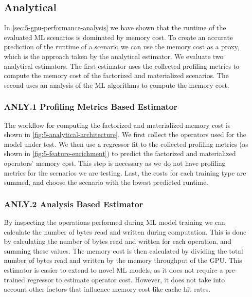 \subsection{Analytical}

In \autoref{sec:5-gpu-performance-analysis} we have shown that the runtime of the evaluated ML scenarios is dominated by memory cost. To create an accurate prediction of the runtime of a scenario we can use the memory cost as a proxy, which is the approach taken by the analytical estimator. We evaluate two analytical estimators. The first estimator uses the collected profiling metrics to compute the memory cost of the factorized and materialized scenarios. The second uses an analysis of the ML algorithms to compute the memory cost.

\subsubsection{ANLY.1 Profiling Metrics Based Estimator}

The workflow for computing the factorized and materialized memory cost is shown in \autoref{fig:5-analytical-architecture}. We first collect the operators used for the model under test. We then use a regressor fit to the collected profiling metrics (as shown in \autoref{fig:5-feature-enrichment}) to predict the factorized and materialized operators' memory cost. This step is necessary as we do not have profiling metrics for the scenarios we are testing. Last, the costs for each training type are summed, and choose the scenario with the lowest predicted runtime.


\subsubsection{ANLY.2 Analysis Based Estimator}
By inspecting the operations performed during ML model training we can calculate the number of bytes read and written during computation. This is done by calculating the number of bytes read and written for each operation, and summing these values. The memory cost is then calculated by dividing the total number of bytes read and written by the memory throughput of the GPU. This estimator is easier to extend to novel ML models, as it does not require a pre-trained regressor to estimate operator cost. However, it does not take into account other factors that influence memory cost like cache hit rates.


